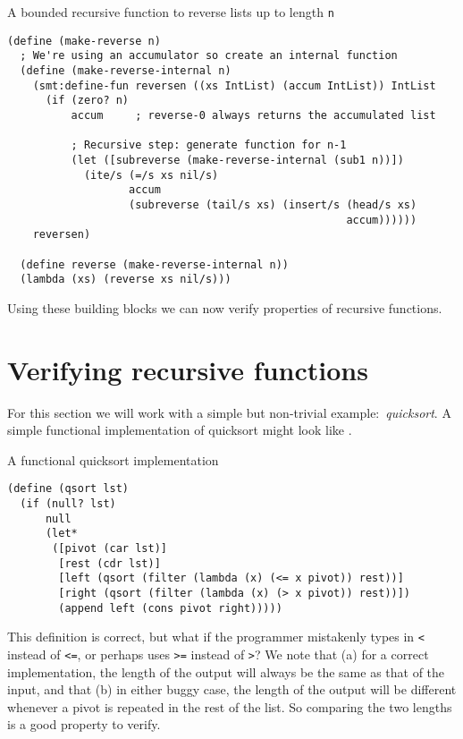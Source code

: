 \begin{program}
\caption{A bounded recursive function to reverse lists up to length \texttt{n}}
\label{fig:reverse-rkt}
\begin{verbatim}
(define (make-reverse n)
  ; We're using an accumulator so create an internal function
  (define (make-reverse-internal n)
    (smt:define-fun reversen ((xs IntList) (accum IntList)) IntList
      (if (zero? n)
          accum     ; reverse-0 always returns the accumulated list

          ; Recursive step: generate function for n-1
          (let ([subreverse (make-reverse-internal (sub1 n))])
            (ite/s (=/s xs nil/s)
                   accum
                   (subreverse (tail/s xs) (insert/s (head/s xs)
                                                     accum))))))
    reversen)

  (define reverse (make-reverse-internal n))
  (lambda (xs) (reverse xs nil/s)))
\end{verbatim}
\end{program}

Using these building blocks we can now verify properties of recursive
functions.

\section{Verifying recursive functions}

For this section we will work with a simple but non-trivial
example:~\textit{quicksort}. A simple functional implementation of quicksort
might look like .

\begin{program}
\caption{A functional quicksort implementation}
\label{fig:qsort}
\begin{verbatim}
(define (qsort lst)
  (if (null? lst)
      null
      (let*
       ([pivot (car lst)]
        [rest (cdr lst)]
        [left (qsort (filter (lambda (x) (<= x pivot)) rest))]
        [right (qsort (filter (lambda (x) (> x pivot)) rest))])
        (append left (cons pivot right)))))
\end{verbatim}
\end{program}

This definition is correct, but what if the programmer mistakenly types in
\texttt{<} instead of \texttt{<=}, or perhaps uses \texttt{>=} instead of
\texttt{>}? We note that (a) for a correct implementation, the length of the
output will always be the same as that of the input, and that (b) in either
buggy case, the length of the output will be different whenever a pivot is
repeated in the rest of the list. So comparing the two lengths is a good
property to verify.

